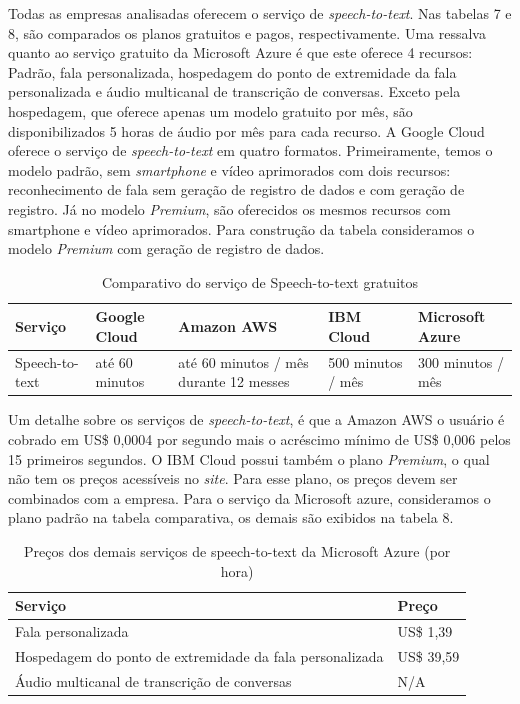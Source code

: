 \documentclass{article}
\begin{document}
Todas as empresas analisadas oferecem o serviço de \textit{speech-to-text}. Nas tabelas 7 e 8, são comparados os planos gratuitos e pagos, respectivamente. Uma ressalva quanto ao serviço gratuito da Microsoft Azure é que este oferece 4 recursos: Padrão, fala personalizada, hospedagem do ponto de extremidade da fala personalizada e áudio multicanal de transcrição de conversas. Exceto pela hospedagem, que oferece apenas um modelo gratuito por mês, são disponibilizados 5 horas de áudio por mês para cada recurso.
A Google Cloud oferece o serviço de \textit{speech-to-text} em quatro formatos. Primeiramente, temos o modelo padrão, sem \textit{smartphone} e vídeo aprimorados com dois recursos: reconhecimento de fala sem geração de registro de dados e com geração de registro. Já no modelo \textit{Premium}, são oferecidos os mesmos recursos com smartphone e vídeo aprimorados. Para construção da tabela consideramos o modelo \textit{Premium} com geração de registro de dados.

\begin{table}[!!ht]
 \caption{Comparativo do serviço de Speech-to-text gratuitos}
  \centering
  \begin{tabular}{lllll}
    \cmidrule(r){1-5}
    Serviço & Google Cloud & Amazon AWS & IBM Cloud & Microsoft Azure \\
    \midrule
    Speech-to-text & até 60 minutos & até 60 minutos / mês durante 12 messes & 500 minutos / mês & 300 minutos / mês \\
    \bottomrule
  \end{tabular}
  \label{tab:table9}
\end{table}

Um detalhe sobre os serviços de \textit{speech-to-text}, é que a Amazon AWS o usuário é cobrado em US\$ 0,0004 por segundo mais o acréscimo mínimo de US\$ 0,006 pelos 15 primeiros segundos. O IBM Cloud possui também o plano \textit{Premium}, o qual não tem os preços acessíveis no \textit{site}. Para esse plano, os preços devem ser combinados com a empresa. Para o serviço da Microsoft azure, consideramos o plano padrão na tabela comparativa, os demais são exibidos na tabela 8.

\begin{table}[!!ht]
 \caption{Preços dos demais serviços de speech-to-text da Microsoft Azure (por hora)}
  \centering
  \begin{tabular}{ll}
    \cmidrule(r){1-2}
    Serviço & Preço \\
    \midrule
    Fala personalizada & US\$ 1,39\\ %
    Hospedagem do ponto de extremidade da fala personalizada & US\$ 39,59 \\ %
    Áudio multicanal de transcrição de conversas & N/A \\
    \bottomrule
  \end{tabular}
  \label{tab:table10}
\end{table}
\end{document}
